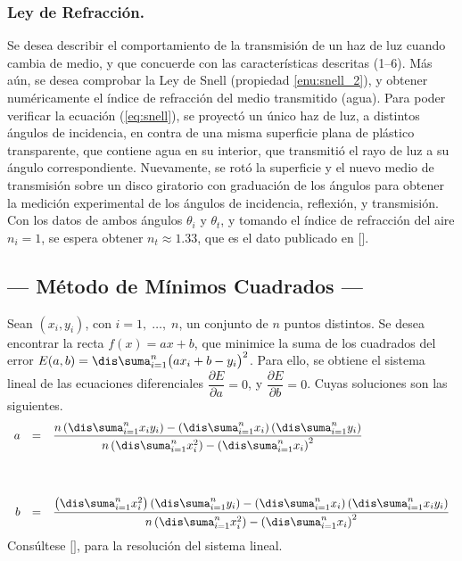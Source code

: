 \documentclass[12pt,a4paper]{article}
\begin{document}
\subsubsection{Ley de Refracción.} %
\label{subs:ley_refraccion}
Se desea describir el comportamiento de la transmisión de un haz de luz cuando cambia de medio, y que concuerde con las características descritas (1--6). Más aún, se desea comprobar la Ley de Snell (propiedad \ref{enu:snell_2}), y obtener numéricamente el índice de refracción del medio transmitido (agua).
Para poder verificar la ecuación (\ref{eq:snell}), se proyectó un único haz de luz, a distintos ángulos de incidencia, en contra de una misma superficie plana de plástico transparente, que contiene agua en su interior, que transmitió el rayo de luz a su ángulo correspondiente.
Nuevamente, se rotó la superficie y el nuevo medio de transmisión sobre un disco giratorio con graduación de los ángulos para obtener la medición experimental de los ángulos de incidencia, reflexión, y transmisión.
Con los datos de ambos ángulos \(\theta _i\) y \(\theta _t\), y tomando el índice de refracción del aire \(n_i=1\), se espera obtener \(n_t \approx 1.33\), que es el dato publicado en \([\)\cite{resnick}\(]\).


\subsection{--- Método de Mínimos Cuadrados ---} %
Sean \((x_i, y_i)\), con \(i=1, \;\ldots,\; n\), un conjunto de \(n\) puntos distintos. Se desea encontrar la recta \(f(x) =ax+b\), que minimice la suma de los cuadrados del error \(E(a,b) = \dis\suma_{i=1} ^n \big(ax_i+b -y_i\big) ^2\). Para ello, se obtiene el sistema lineal de las ecuaciones diferenciales \(\dfrac{\partial E}{\partial a} =0\), y \(\dfrac{\partial E}{\partial b} =0\). Cuyas soluciones son las siguientes.
\begin{equation}
	\begin{array}{rcl}
		a&=&\dfrac{n\left(\dis\suma_{i=1}^n x_i y_i\right)-\left(\dis\suma_{i=1}^n x_i \right)\left(\dis\suma_{i=1}^n y_i\right) }{n \left(\dis\suma_{i=1}^n x_i^2\right)-\left(\dis\suma_{i=1}^n x_i\right)^2} \\[1.6cm]
		b&=&\dfrac{\left(\dis\suma_{i=1}^n x_i^2\right)\left(\dis\suma_{i=1}^n y_i\right)-\left(\dis\suma_{i=1}^n x_i \right)\left(\dis\suma_{i=1}^n x_i y_i\right) }{n \left(\dis\suma_{i=1}^n x_i^2\right)-\left(\dis\suma_{i=1}^n x_i\right)^2}
	\end{array}
	\label{eq:intercept}
\end{equation}
Consúltese \([\)\cite{mont}\(]\), para la resolución del sistema lineal.
\end{document}
